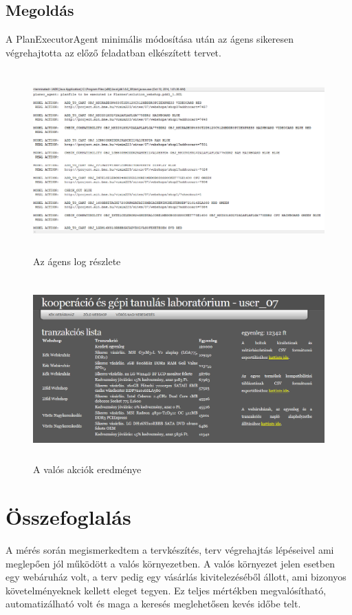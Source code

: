\subsection{Megoldás}
A PlanExecutorAgent minimális módosítása után az ágens sikeresen végrehajtotta az előző feladatban elkészített tervet.
\begin{figure}[h]
\begin{center}
\includegraphics[height=7cm]{figures/dump2.png}
\caption{Az ágens log részlete}
\end{center}
\end{figure}
\begin{figure}[h]
\begin{center}
\includegraphics[height=7cm]{figures/web2.png}
\caption{A valós akciók eredménye}
\end{center}
\end{figure}
\section{Összefoglalás}
A mérés során megismerkedtem a tervkészítés, terv végrehajtás lépéseivel ami meglepően jól működött a valós környezetben. A valós környezet jelen esetben egy webáruház volt, a terv pedig egy vásárlás kivitelezéséből állott, ami bizonyos követelményeknek kellett eleget tegyen. Ez teljes mértékben megvalósítható, automatizálható volt és maga a keresés meglehetősen kevés időbe telt. 